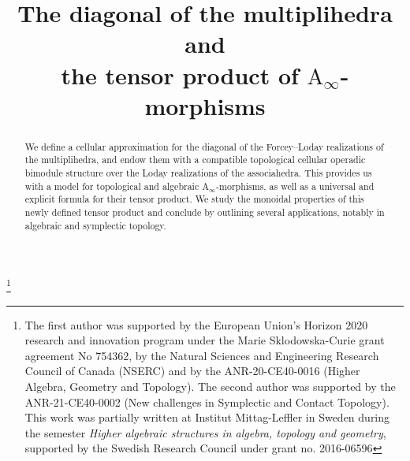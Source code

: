\documentclass[JEP,XML,SOM,NoFloatCountersInSection,Unicode,published]{cedram}
\theoremstyle{definition}
\theoremstyle{plain}
\begin{document}
\frontmatter
\title[The diagonal of the multiplihedra]{The diagonal of the multiplihedra and\\ the tensor product of $\mathrm{A}_\infty$-morphisms}

\author[\initial{G.} \lastname{Laplante-Anfossi}]{ }
\address{School of Mathematics and Statistics, University of Melbourne\\ Parkville, VIC, 3010, Australia}

\author[\initial{T.} \lastname{Mazuir}]{ }
\address{Institut für Mathematik, Humboldt Universität zu Berlin\\
Rudower Chaussee 25, 12489 Berlin, Germany}

\thanks{The first author was supported by the European Union's Horizon 2020 research and innovation program under the Marie Sklodowska-Curie grant agreement No 754362, by the Natural Sciences and Engineering Research Council of Canada (NSERC) and by the ANR-20-CE40-0016 (Higher Algebra, Geometry and Topology). The second author was supported by the ANR-21-CE40-0002 (New challenges in Symplectic and Contact Topology). This work was partially written at Institut Mittag-Leffler in Sweden during the semester \emph{Higher algebraic structures in algebra, topology and geometry}, supported by the Swedish Research Council under grant no. 2016-06596}

\begin{abstract}
We define a cellular approximation for the diagonal of the Forcey--Loday realizations of the multiplihedra, and endow them with a compatible topological cellular operadic bimodule structure over the Loday realizations of the associahedra. This provides us with a model for topological and algebraic $\mathrm{A}_\infty$-morphisms, as well as a universal and explicit formula for their tensor product. We study the monoidal properties of this newly defined tensor product and conclude by outlining several applications, notably in algebraic and symplectic topology.
\end{abstract}


\end{document}
